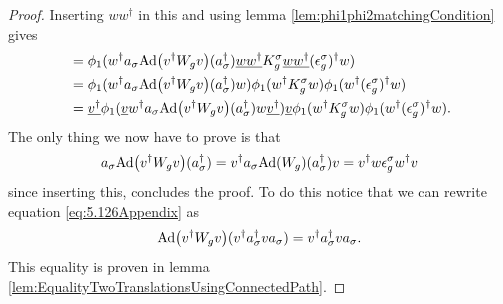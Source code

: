\documentclass[11pt,a4paper,twoside]{article}
\numberwithin{equation}{section}
\begin{document}
\begin{proof}
		Inserting $w w^\dagger$ in this and using lemma \ref{lem:phi1phi2matchingCondition} gives
		\begin{align}
			&=\phi_1(w^\dagger a_\sigma \Ad{v^\dagger W_g v}(a_\sigma^\dagger)\underline{w w^\dagger}K_g^\sigma \underline{w w^\dagger}  (\epsilon_g^\sigma)^\dagger w)\\
			&=\phi_1(w^\dagger a_\sigma \Ad{v^\dagger W_g v}(a_\sigma^\dagger)w)\phi_1( w^\dagger K_g^\sigma w ) \phi_1( w^\dagger  (\epsilon_g^\sigma)^\dagger w)\\
			&=\underline{v^\dagger}\phi_1(\underline{v} w^\dagger a_\sigma \Ad{v^\dagger W_g v}(a_\sigma^\dagger)w \underline{v^\dagger})\underline{v}\phi_1( w^\dagger K_g^\sigma w ) \phi_1( w^\dagger  (\epsilon_g^\sigma)^\dagger w).
		\end{align}
		The only thing we now have to prove is that
		\begin{equation}\label{eq:5.126Appendix}
			a_\sigma \Ad{v^\dagger W_g v}(a_\sigma^\dagger)=v^\dagger a_\sigma \Ad{W_g}(a_\sigma^\dagger)v=v^\dagger w \epsilon_g^\sigma w^\dagger v
		\end{equation}
		since inserting this, concludes the proof. To do this notice that we can rewrite equation \eqref{eq:5.126Appendix} as
		\begin{equation}
			\Ad{v^\dagger W_g v}(v^\dagger a_\sigma^\dagger v a_\sigma)=v^\dagger a_\sigma^\dagger v a_\sigma.
		\end{equation}
		This equality is proven in lemma \ref{lem:EqualityTwoTranslationsUsingConnectedPath}.
	\end{proof}
\end{document}
